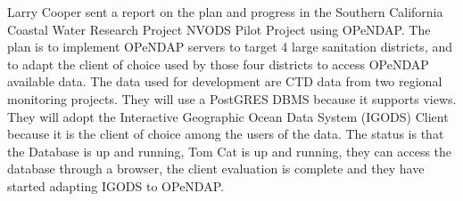 Larry Cooper sent a report on the plan and progress in the Southern
California Coastal Water Research Project NVODS Pilot Project
using OPeNDAP.  The plan is to implement OPeNDAP servers to
target 4 large sanitation districts, and to adapt the client
of choice used by those four districts to access OPeNDAP
available data.  The data used for development are CTD data 
from two regional monitoring projects.  They will use a PostGRES
DBMS because it supports views.  They will adopt the Interactive
Geographic Ocean Data System (IGODS) Client because it is the
client of choice among the users of the data.  The status is that
the Database is up and running, Tom Cat is up and running, they
can access the database through a browser, the client evaluation
is complete and they have started adapting IGODS to OPeNDAP.

%
%
%
